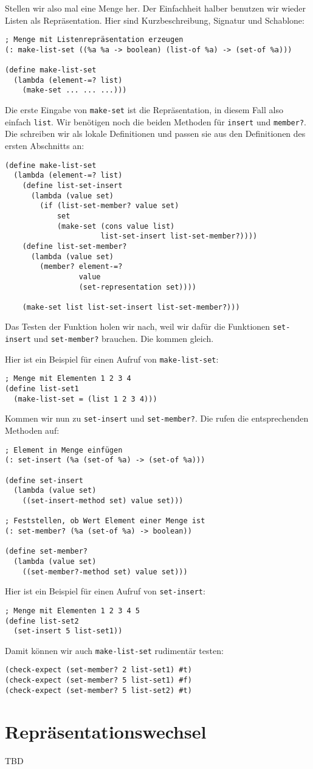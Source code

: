 Stellen wir also mal eine Menge her.  Der Einfachheit halber benutzen
wir wieder Listen als Repräsentation.  Hier sind Kurzbeschreibung,
Signatur und Schablone:
%
\begin{lstlisting}
; Menge mit Listenrepräsentation erzeugen
(: make-list-set ((%a %a -> boolean) (list-of %a) -> (set-of %a)))

(define make-list-set
  (lambda (element-=? list)
    (make-set ... ... ...)))
\end{lstlisting}
%
Die erste Eingabe von \lstinline{make-set} ist die Repräsentation, in
diesem Fall also einfach \lstinline{list}.  Wir benötigen noch die
beiden Methoden für \lstinline{insert} und \lstinline{member?}.  Die
schreiben wir als lokale Definitionen und passen sie aus den
Definitionen des ersten Abschnitts an:
%
\begin{lstlisting}
(define make-list-set
  (lambda (element-=? list)
    (define list-set-insert
      (lambda (value set)
        (if (list-set-member? value set)
            set
            (make-set (cons value list)
                      list-set-insert list-set-member?))))
    (define list-set-member?
      (lambda (value set)
        (member? element-=?
                 value
                 (set-representation set))))
        
    (make-set list list-set-insert list-set-member?)))
\end{lstlisting}
%
Das Testen der Funktion holen wir nach, weil wir dafür die Funktionen
\lstinline{set-insert} und \lstinline{set-member?} brauchen.  Die
kommen gleich.

Hier ist ein Beispiel für einen Aufruf von \lstinline{make-list-set}:
%
\begin{lstlisting}
; Menge mit Elementen 1 2 3 4
(define list-set1
  (make-list-set = (list 1 2 3 4)))
\end{lstlisting}
%
Kommen wir nun zu \lstinline{set-insert} und \lstinline{set-member?}.
Die rufen die entsprechenden Methoden auf:
%
\begin{lstlisting}
; Element in Menge einfügen
(: set-insert (%a (set-of %a) -> (set-of %a)))

(define set-insert
  (lambda (value set)
    ((set-insert-method set) value set)))

; Feststellen, ob Wert Element einer Menge ist
(: set-member? (%a (set-of %a) -> boolean))

(define set-member?
  (lambda (value set)
    ((set-member?-method set) value set)))
\end{lstlisting}
%
Hier ist ein Beispiel für einen Aufruf von \lstinline{set-insert}:
%
\begin{lstlisting}
; Menge mit Elementen 1 2 3 4 5
(define list-set2
  (set-insert 5 list-set1))
\end{lstlisting}
%
Damit können wir auch \lstinline{make-list-set} rudimentär testen:
%
\begin{lstlisting}
(check-expect (set-member? 2 list-set1) #t)
(check-expect (set-member? 5 list-set1) #f)
(check-expect (set-member? 5 list-set2) #t)
\end{lstlisting}

\section{Repräsentationswechsel}

TBD


